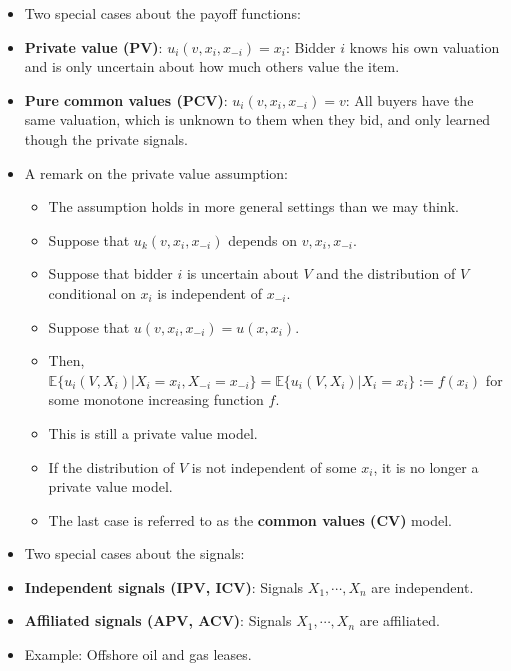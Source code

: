\documentclass[]{book}
\providecommand{\tightlist}{%
  \setlength{\itemsep}{0pt}\setlength{\parskip}{0pt}}
\begin{document}
\begin{itemize}
\tightlist
\item
  Two special cases about the payoff functions:
\item
  \textbf{Private value (PV)}: \(u_i(v, x_i, x_{-i}) = x_i\): Bidder
  \(i\) knows his own valuation and is only uncertain about how much
  others value the item.
\item
  \textbf{Pure common values (PCV)}: \(u_i(v, x_i, x_{-i}) = v\): All
  buyers have the same valuation, which is unknown to them when they
  bid, and only learned though the private signals.
\item
  A remark on the private value assumption:

  \begin{itemize}
  \tightlist
  \item
    The assumption holds in more general settings than we may think.
  \item
    Suppose that \(u_k(v, x_i, x_{-i})\) depends on \(v, x_i, x_{-i}\).
  \item
    Suppose that bidder \(i\) is uncertain about \(V\) and the
    distribution of \(V\) conditional on \(x_i\) is independent of
    \(x_{-i}\).
  \item
    Suppose that \(u(v, x_i, x_{-i}) = u(x, x_i)\).
  \item
    Then,
    \(\mathbb{E}\{u_i(V, X_i)|X_i = x_i, X_{-i} = x_{-i}\} = \mathbb{E}\{u_i(V, X_i)|X_i = x_i\} := f(x_i)\)
    for some monotone increasing function \(f\).
  \item
    This is still a private value model.
  \item
    If the distribution of \(V\) is not independent of some \(x_i\), it
    is no longer a private value model.
  \item
    The last case is referred to as the \textbf{common values (CV)}
    model.
  \end{itemize}
\item
  Two special cases about the signals:
\item
  \textbf{Independent signals (IPV, ICV)}: Signals \(X_1, \cdots, X_n\)
  are independent.
\item
  \textbf{Affiliated signals (APV, ACV)}: Signals \(X_1, \cdots, X_n\)
  are affiliated.
\item
  Example: Offshore oil and gas leases.


\end{itemize}
\end{document}
